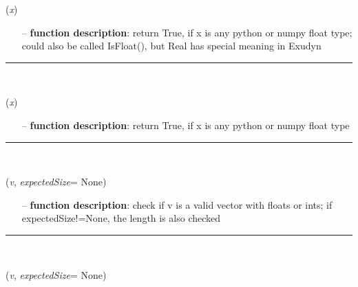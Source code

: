 \begin{itemize}[leftmargin=1.4cm]
\begin{flushleft}
({\it x})
\end{flushleft}
\setlength{\itemindent}{0.7cm}
\begin{itemize}[leftmargin=0.7cm]
\item[--]
{\bf function description}: return True, if x is any python or numpy float type; could also be called IsFloat(), but Real has special meaning in Exudyn
\vspace{12pt}\end{itemize}
%
\noindent\rule{8cm}{0.75pt}\vspace{1pt} \\ 
\begin{flushleft}
\label{sec:advancedUtilities:IsInteger}
({\it x})
\end{flushleft}
\setlength{\itemindent}{0.7cm}
\begin{itemize}[leftmargin=0.7cm]
\item[--]
{\bf function description}: return True, if x is any python or numpy float type
\vspace{12pt}\end{itemize}
%
\noindent\rule{8cm}{0.75pt}\vspace{1pt} \\ 
\begin{flushleft}
\label{sec:advancedUtilities:IsVector}
({\it v}, {\it expectedSize}= None)
\end{flushleft}
\setlength{\itemindent}{0.7cm}
\begin{itemize}[leftmargin=0.7cm]
\item[--]
{\bf function description}: check if v is a valid vector with floats or ints; if expectedSize!=None, the length is also checked
\vspace{12pt}\end{itemize}
%
\noindent\rule{8cm}{0.75pt}\vspace{1pt} \\ 
\begin{flushleft}
\label{sec:advancedUtilities:IsIntVector}
({\it v}, {\it expectedSize}= None)
\end{flushleft}
\setlength{\itemindent}{0.7cm}
\begin{itemize}[leftmargin=0.7cm]

\end{itemize}
\end{itemize}
